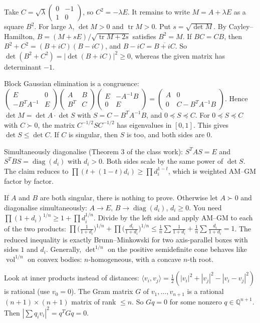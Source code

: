 \documentclass[11pt,a4paper]{article}
\begin{document}
Take \(C=\sqrt\lambda\begin{pmatrix}0&-1\\1&0\end{pmatrix}\), so \(C^2=-\lambda E\). It remains to write \(M=A+\lambda E\) as a square \(B^2\).
For large \(\lambda\), \(\det M>0\) and \(\operatorname{tr}M>0\). Put \(s=\sqrt{\det M}\). By Cayley--Hamilton, \(B=(M+sE)/\sqrt{\operatorname{tr}M+2s}\) satisfies \(B^2=M\).
If \(BC=CB\), then \(B^2+C^2=(B+iC)(B-iC)\), and \(B-iC=\overline{B+iC}\).
So \(\det(B^2+C^2)=|\det(B+iC)|^2\ge0\), whereas the given matrix has determinant \(-1\).

Block Gaussian elimination is a congruence:
\(\begin{pmatrix}E&0\\-B^TA^{-1}&E\end{pmatrix}\begin{pmatrix}A&B\\B^T&C\end{pmatrix}\begin{pmatrix}E&-A^{-1}B\\0&E\end{pmatrix}=\begin{pmatrix}A&0\\0&C-B^TA^{-1}B\end{pmatrix}\).
Hence \(\det M=\det A\cdot\det S\) with \(S=C-B^TA^{-1}B\), and \(0\preceq S\preceq C\). For \(0\preceq S\preceq C\) with \(C\succ0\), the matrix \(C^{-1/2}SC^{-1/2}\) has eigenvalues in \([0,1]\). This gives \(\det S\le\det C\). If \(C\) is singular, then \(S\) is too, and both sides are \(0\).

Simultaneously diagonalise (Theorem 3 of the class work): \(S^TAS=E\) and \(S^TBS=\operatorname{diag}(d_i)\) with \(d_i>0\). Both sides scale by the same power of \(\det S\).
The claim reduces to \(\prod(t+(1-t)d_i)\ge\prod d_i^{1-t}\), which is weighted AM--GM factor by factor.

If \(A\) and \(B\) are both singular, there is nothing to prove. Otherwise let \(A\succ0\) and diagonalise simultaneously: \(A\to E\), \(B\to\operatorname{diag}(d_i)\), \(d_i\ge0\). You need \(\prod(1+d_i)^{1/n}\ge1+\prod d_i^{1/n}\).
Divide by the left side and apply AM--GM to each of the two products: \(\prod\bigl(\frac{1}{1+d_i}\bigr)^{1/n}+\prod\bigl(\frac{d_i}{1+d_i}\bigr)^{1/n}\le\frac1n\sum\frac{1}{1+d_i}+\frac1n\sum\frac{d_i}{1+d_i}=1\).
The reduced inequality is exactly Brunn--Minkowski for two axis-parallel boxes with sides \(1\) and \(d_i\). Generally, \(\det^{1/n}\) on the positive semidefinite cone behaves like \(\operatorname{vol}^{1/n}\) on convex bodies: \(n\)-homogeneous, with a concave \(n\)-th root.

Look at inner products instead of distances: \(\langle v_i,v_j\rangle=\frac12(|v_i|^2+|v_j|^2-|v_i-v_j|^2)\) is rational (use \(v_0=0\)).
The Gram matrix \(G\) of \(v_1,\dots,v_{n+1}\) is a rational \((n+1)\times(n+1)\) matrix of rank \(\le n\). So \(Gq=0\) for some nonzero \(q\in\mathbb Q^{n+1}\).
Then \(|\sum q_iv_i|^2=q^TGq=0\).
\end{document}

